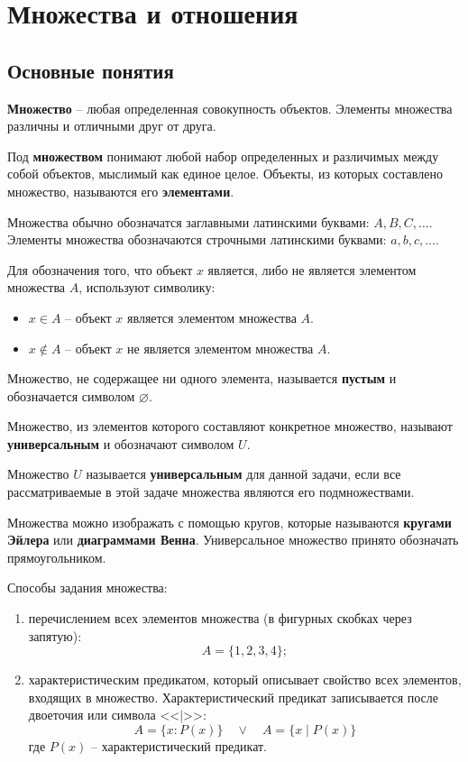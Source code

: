 \section{Множества и отношения}

\subsection{Основные понятия}

\textbf{Множество} -- любая определенная совокупность объектов. Элементы множества различны и отличными друг от друга.

Под \textbf{множеством} понимают любой набор определенных и различимых между собой объектов, мыслимый как единое целое. Объекты, из которых составлено множество, называются его \textbf{элементами}.

Множества обычно обозначатся заглавными латинскими буквами: \(A, B, C, \ldots\). Элементы множества обозначаются строчными латинскими буквами: \(a, b, c, \ldots\).

Для обозначения того, что объект \(x\) является, либо не является элементом множества \(A\), используют символику:
\begin{itemize}
    \item \(x \in A\) -- объект \(x\) является элементом множества \(A\).
    \item \(x \notin A\) -- объект \(x\) не является элементом множества \(A\).
\end{itemize}

Множество, не содержащее ни одного элемента, называется \textbf{пустым} и обозначается символом \(\varnothing\).

Множество, из элементов которого составляют конкретное множество, называют \textbf{универсальным} и обозначают символом \(U\).

Множество \(U\) называется \textbf{универсальным} для данной задачи, если все рассматриваемые в этой задаче множества являются его подмножествами.

Множества можно изображать с помощью кругов, которые называются \textbf{кругами Эйлера} или \textbf{диаграммами Венна}. Универсальное множество принято обозначать прямоугольником.

Способы задания множества:
\begin{enumerate}
    \item перечислением всех элементов множества (в фигурных скобках через запятую):
          \[
              A = \{1, 2, 3, 4\};
          \]
    \item характеристическим предикатом, который описывает свойство всех элементов, входящих в множество. Характеристический предикат записывается после двоеточия или символа <<\(\mid\)>>:
          \[
              A = \{x: P(x)\}
              \quad
              \lor
              \quad
              A = \{x \mid P(x)\}
          \]
          где \(P(x)\) -- характеристический предикат.
\end{enumerate}

